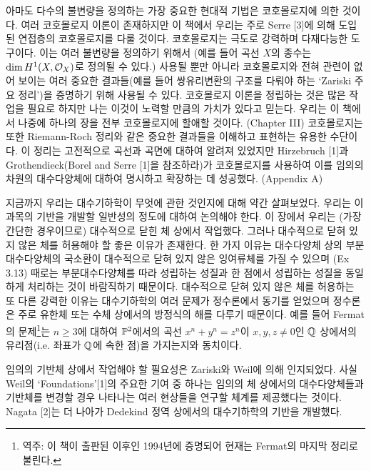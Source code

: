 	아마도 다수의 불변량을 정의하는 가장 중요한 현대적 기법은 코호몰로지에 의한 것이다.
	여러 코호몰로지 이론이 존재하지만 이 책에서 우리는 주로 Serre [3]에 의해 도입된 연접층의 코호몰로지를 다룰 것이다.
	코호몰로지는 극도로 강력하며 다재다능한 도구이다. 이는 여러 불변량을 정의하기 위해서%
	(예를 들어 곡선 $X$의 종수는 $\dim H^1(X,\mathcal{O}_X)$로 정의될 수 있다.) 사용될 뿐만 아니라
	코호몰로지와 전혀 관련이 없어 보이는 여러 중요한 결과들(예를 들어 쌍유리변환의 구조를 다뤄야 하는 `Zariski 주요 정리')을
	증명하기 위해 사용될 수 있다.
	코호몰로지 이론을 정립하는 것은 많은 작업을 필요로 하지만 나는 이것이 노력할 만큼의 가치가 있다고 믿는다.
	우리는 이 책에서 나중에 하나의 장을 전부 코호몰로지에 할애할 것이다. (Chapter III)
	코호몰로지는 또한 Riemann-Roch 정리와 같은 중요한 결과들을 이해하고 표현하는 유용한 수단이다.
	이 정리는 고전적으로 곡선과 곡면에 대하여 알려져 있었지만
	Hirzebruch [1]과 Grothendieck(Borel and Serre [1]을 참조하라)가 코호몰로지를 사용하여
	이를 임의의 차원의 대수다양체에 대하여 명시하고 확장하는 데 성공했다. (Appendix A)
	
	지금까지 우리는 대수기하학이 무엇에 관한 것인지에 대해 약간 살펴보었다.
	우리는 이 과목의 기반을 개발할 일반성의 정도에 대하여 논의해야 한다.
	이 장에서 우리는 (가장 간단한 경우이므로) 대수적으로 닫힌 체 상에서 작업했다.
	그러나 대수적으로 닫혀 있지 않은 체를 허용해야 할 좋은 이유가 존재한다.
	한 가지 이유는 대수다양체 상의 부분대수다양체의 국소환이 대수적으로 닫혀 있지 않은 잉여류체를 가질 수 있으며
	(Ex 3.13) 때로는 부분대수다양체를 따라 성립하는 성질과 한 점에서 성립하는 성질을 동일하게 처리하는 것이 바람직하기 때문이다.
	대수적으로 닫혀 있지 않은 체를 허용하는 또 다른 강력한 이유는 대수기하학의 여러 문제가 정수론에서 동기를 얻었으며
	정수론은 주로 유한체 또는 수체 상에서의 방정식의 해를 다루기 때문이다.
	예를 들어 Fermat의 문제\footnote{역주: 이 책이 출판된 이후인 1994년에 증명되어 현재는 Fermat의 마지막 정리로 불린다.}는
	$n\ge 3$에 대하여 $\mathbb{P}^2$에서의 곡선 $x^n+y^n=z^n$이
	$x,y,z\ne 0$인 $\mathbb Q$ 상에서의 유리점(i.e. 좌표가 $\mathbb Q$에 속한 점)을 가지는지와 동치이다.
	
	임의의 기반체 상에서 작업해야 할 필요성은 Zariski와 Weil에 의해 인지되었다.
	사실 Weil의 `Foundations'[1]의 주요한 기여 중 하나는 임의의 체 상에서의 대수다양체들과
	기반체를 변경할 경우 나타나는 여러 현상들을 연구할 체계를 제공했다는 것이다.
	Nagata [2]는 더 나아가 Dedekind 정역 상에서의 대수기하학의 기반을 개발했다.
	
